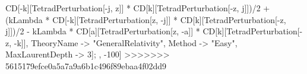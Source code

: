 CD[-k][TetradPerturbation[-j, z]] * CD[k][TetradPerturbation[-z, j]])/2 + (kLambda * CD[-k][TetradPerturbation[z, -j]] * CD[k][TetradPerturbation[-z, j]])/2 - kLambda * CD[a][TetradPerturbation[z, -a]] * CD[k][TetradPerturbation[-z, -k]], TheoryName -> "GeneralRelativity", Method -> "Easy", MaxLaurentDepth -> 3]; , -100]
>>>>>>> 5615179efce0a5a7a9a6b1c496f89ebaa4f02dd9
